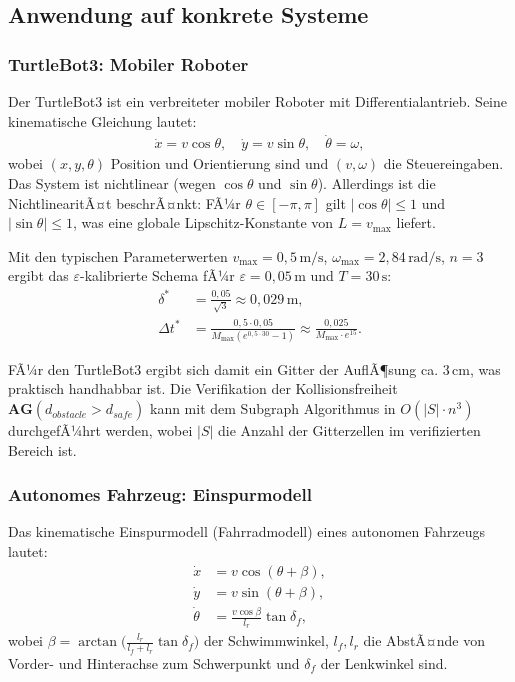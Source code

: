 ﻿\documentclass[a4paper,12pt]{article}
\theoremstyle{definition}
\begin{document}
\subsection{Anwendung auf konkrete Systeme}

\subsubsection{TurtleBot3: Mobiler Roboter}

Der TurtleBot3 ist ein verbreiteter mobiler Roboter mit Differentialantrieb. Seine kinematische Gleichung lautet:
\begin{align}
  \dot{x} = v\cos\theta, \quad \dot{y} = v\sin\theta, \quad \dot{\theta} = \omega,
\end{align}
wobei $(x, y, \theta)$ Position und Orientierung sind und $(v, \omega)$ die Steuereingaben. Das System ist nichtlinear (wegen $\cos\theta$ und $\sin\theta$). Allerdings ist die NichtlinearitÃ¤t beschrÃ¤nkt: FÃ¼r $\theta \in [-\pi, \pi]$ gilt $|\cos\theta| \leq 1$ und $|\sin\theta| \leq 1$, was eine globale Lipschitz-Konstante von $L = v_{\max}$ liefert.

Mit den typischen Parameterwerten $v_{\max} = 0{,}5\,\text{m/s}$, $\omega_{\max} = 2{,}84\,\text{rad/s}$, $n = 3$ ergibt das $\varepsilon$-kalibrierte Schema fÃ¼r $\varepsilon = 0{,}05\,\text{m}$ und $T = 30\,\text{s}$:
\begin{align}
  \delta^* &= \frac{0{,}05}{\sqrt{3}} \approx 0{,}029\,\text{m}, \\
  \Delta t^* &= \frac{0{,}5 \cdot 0{,}05}{M_{\max}(e^{0{,}5 \cdot 30}-1)} \approx \frac{0{,}025}{M_{\max} \cdot e^{15}}.
\end{align}

FÃ¼r den TurtleBot3 ergibt sich damit ein Gitter der AuflÃ¶sung ca. 3\,cm, was praktisch handhabbar ist. Die Verifikation der Kollisionsfreiheit $\mathbf{AG}(d_{\mathit{obstacle}} > d_{\mathit{safe}})$ kann mit dem Subgraph Algorithmus in $O(|S| \cdot n^3)$ durchgefÃ¼hrt werden, wobei $|S|$ die Anzahl der Gitterzellen im verifizierten Bereich ist.

\subsubsection{Autonomes Fahrzeug: Einspurmodell}

Das kinematische Einspurmodell (Fahrradmodell) eines autonomen Fahrzeugs lautet:
\begin{align}
  \dot{x} &= v\cos(\theta + \beta), \\
  \dot{y} &= v\sin(\theta + \beta), \\
  \dot{\theta} &= \frac{v\cos\beta}{l_r}\tan\delta_f,
\end{align}
wobei $\beta = \arctan\!\bigl(\frac{l_r}{l_f + l_r}\tan\delta_f\bigr)$ der Schwimmwinkel, $l_f, l_r$ die AbstÃ¤nde von Vorder- und Hinterachse zum Schwerpunkt und $\delta_f$ der Lenkwinkel sind.
\end{document}
